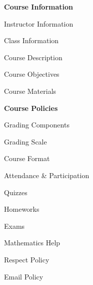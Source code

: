 \documentclass[11pt,letterpaper]{article}
\begin{document}
\mytitle




\begin{minipage}[t]{0.45\textwidth}
{\bfseries\color{stacred} Course Information} \dotfill \pageref{course_info} \par
\hspace{0.3cm} Instructor Information \dotfill \pageref{instr_info} \par
\hspace{0.3cm} Class Information \dotfill \pageref{class_info} \par
\hspace{0.3cm} Course Description \dotfill \pageref{course_desc} \par
\hspace{0.3cm} Course Objectives \dotfill \pageref{course_obj} \par
\hspace{0.3cm} Course Materials \dotfill \pageref{course_mat} \par
{\bfseries\color{stacred} Course Policies} \dotfill \pageref{course_polc} \par
\hspace{0.3cm} Grading Components \dotfill \pageref{grade_comp} \par
\hspace{0.3cm} Grading Scale \dotfill \pageref{grade_scale} \par
\hspace{0.3cm} Course Format \dotfill \pageref{course_form} \par
\hspace{0.3cm} Attendance \& Participation \dotfill \pageref{attend} \par
\hspace{0.3cm} Quizzes \dotfill \pageref{quiz} \par
\hspace{0.3cm} Homeworks \dotfill \pageref{hw} \par
\hspace{0.3cm} Exams \dotfill \pageref{exams} \par
\hspace{0.3cm} Mathematics Help \dotfill \pageref{help} \par
\hspace{0.3cm} Respect Policy \dotfill \pageref{respect} \par
\hspace{0.3cm} Email Policy \dotfill \pageref{email_policy} \par

\end{minipage}
\end{document}
